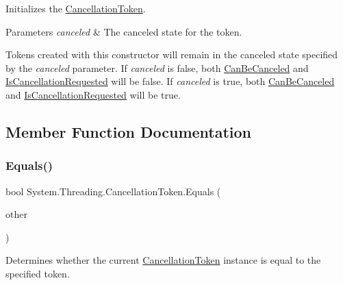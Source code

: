 Initializes the \hyperlink{}{Cancellation\+Token}. 


\begin{DoxyParams}{Parameters}
{\em canceled} & The canceled state for the token. \\
\hline
\end{DoxyParams}


Tokens created with this constructor will remain in the canceled state specified by the {\itshape canceled}  parameter. If {\itshape canceled}  is false, both \hyperlink{struct_system_1_1_threading_1_1_cancellation_token_ae9726dbc54733ce5d174707fc596b8e9}{Can\+Be\+Canceled} and \hyperlink{struct_system_1_1_threading_1_1_cancellation_token_a1b0338d63f9b268339e7348629301748}{Is\+Cancellation\+Requested} will be false. If {\itshape canceled}  is true, both \hyperlink{struct_system_1_1_threading_1_1_cancellation_token_ae9726dbc54733ce5d174707fc596b8e9}{Can\+Be\+Canceled} and \hyperlink{struct_system_1_1_threading_1_1_cancellation_token_a1b0338d63f9b268339e7348629301748}{Is\+Cancellation\+Requested} will be true. 

\subsection{Member Function Documentation}
\mbox{\label{struct_system_1_1_threading_1_1_cancellation_token_a774b38149683d6b99a6a5190198ad629}} 
\subsubsection{\texorpdfstring{Equals()}{Equals()}\hspace{0.1cm}{\footnotesize\ttfamily [1/2]}}
{\footnotesize\ttfamily bool System.\+Threading.\+Cancellation\+Token.\+Equals (\begin{DoxyParamCaption}\item[{\hyperlink{struct_system_1_1_threading_1_1_cancellation_token}{Cancellation\+Token}}]{other }\end{DoxyParamCaption})\hspace{0.3cm}{\ttfamily [inline]}}



Determines whether the current \hyperlink{}{Cancellation\+Token} instance is equal to the specified token. 


